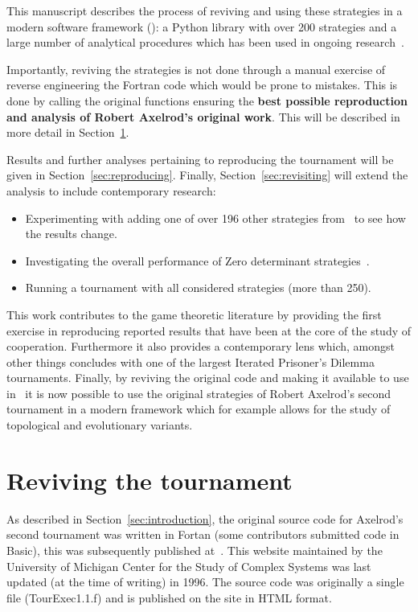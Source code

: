 \documentclass{article}
\begin{document}
This manuscript describes the process of reviving and using these strategies in
a modern software framework (\cite{AxelrodProject}): a Python library with over
200 strategies and a large number of analytical procedures which has been used
in ongoing research~\cite{Harper2017, Knight2017}.

Importantly, reviving the strategies is not done
through a manual exercise of reverse engineering the Fortran code which would be
prone to mistakes. This is done by calling the original functions ensuring the
\textbf{best possible reproduction and analysis of Robert Axelrod's original
work}. This will be described in more detail in Section~\ref{sec:reviving}.

Results and further analyses pertaining to reproducing the tournament will be
given in Section~\ref{sec:reproducing}. Finally, Section~\ref{sec:revisiting}
will extend the analysis to include contemporary research:

\begin{itemize}
    \item Experimenting with adding one of over 196 other strategies
        from~\cite{AxelrodProject} to see how the results change.
    \item Investigating the overall performance of Zero determinant
        strategies~\cite{Press2012}.
    \item Running a tournament with all considered strategies (more than 250).
\end{itemize}

This work contributes to the game theoretic literature by providing the first
exercise in reproducing reported results that have been at the core of the study
of cooperation. Furthermore it also provides a contemporary lens which, amongst
other things concludes with one of the largest Iterated Prisoner's Dilemma
tournaments.
Finally, by reviving the original code and making it available to use
in~\cite{AxelrodProject} it is now possible to use the original strategies of
Robert Axelrod's second tournament in a modern framework which for example
allows for the study of topological and evolutionary variants.

\section{Reviving the tournament}\label{sec:reviving}

As described in Section~\ref{sec:introduction}, the original source code for
Axelrod's second tournament was written in Fortan (some contributors submitted
code in Basic), this was subsequently published at~\cite{Axelrod1980bCode}. This
website maintained by the University of Michigan Center for the Study of Complex
Systems was last updated (at the time of writing) in 1996. The source code was
originally a single file (TourExec1.1.f) and is published on the site in HTML format.
\end{document}
